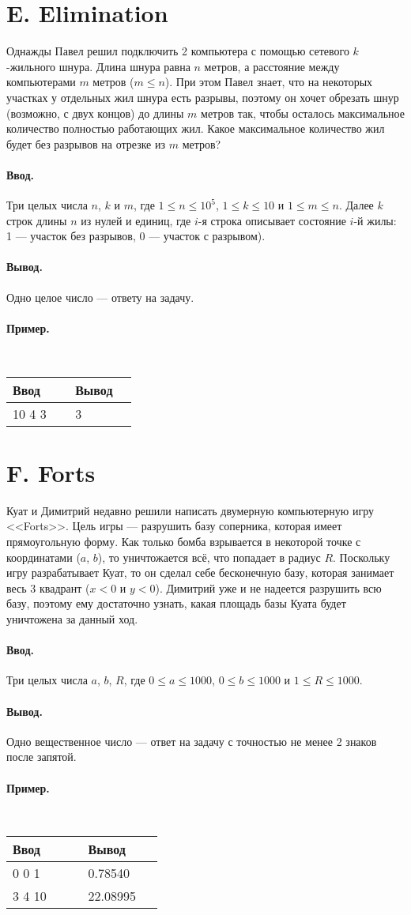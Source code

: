 \documentclass[12pt, a5paper]{article}
\newcommand{\informat}[1]
{
	\paragraph{Ввод.\\} #1
}
\newcommand{\outformat}[1]
{
	\paragraph{Вывод.\\} #1
}
\newcommand{\example}[2]
{
	\paragraph{Пример.\\}
	{\tt
	\begin{tabular}{|p{0.4\linewidth}|p{0.4\linewidth}|}
	\hline
	Ввод & Вывод \\
	\hline
	#1 & #2		\\
	\hline
	\end{tabular}
	}
}
\newcommand{\examplee}[4]
{
	\paragraph{Пример.\\}
	{\tt
	\begin{tabular}{|p{0.4\linewidth}|p{0.4\linewidth}|}
	\hline
	Ввод 	& Вывод  	\\
	\hline
	#1 		& #2 		\\
	\hline
	#3		& #4		\\
	\hline
	\end{tabular}
	}
}
\begin{document}
\section*{E. Elimination}

Однажды Павел решил подключить 2 компьютера с помощью сетевого $k$-жильного шнура. Длина шнура равна $n$ метров, а расстояние между компьютерами $m$ метров ($m \leqslant n$). При этом Павел знает, что на некоторых участках у отдельных жил шнура есть разрывы, поэтому он хочет обрезать шнур (возможно, с двух концов) до длины $m$ метров так, чтобы осталось максимальное количество полностью работающих жил. Какое максимальное количество жил будет без разрывов на отрезке из $m$ метров?

\informat{Три целых числа $n$, $k$ и $m$, где $1 \leqslant n \leqslant 10^5$,  $1 \leqslant k \leqslant 10$ и $1 \leqslant m \leqslant n$. \newline
Далее $k$ строк длины $n$ из нулей и единиц, где $i$-я строка описывает состояние $i$-й жилы: 1 --- участок без разрывов, 0 --- участок с разрывом).
}

\outformat{Одно целое число --- ответу на задачу.}

\example{
10 4 3 \newline
1110111111 \newline
1011111111 \newline
0011111100 \newline
1111110111}
{3}



\section*{F. Forts}

Куат и Димитрий недавно решили написать двумерную компьютерную игру <<Forts>>. Цель игры --- разрушить базу соперника, которая имеет прямоугольную форму. Как только бомба взрывается в некоторой точке с координатами ($a$, $b$), то уничтожается всё, что попадает в радиус $R$. Поскольку игру разрабатывает Куат, то он сделал себе бесконечную базу, которая занимает весь 3 квадрант ($x < 0$ и $y < 0$). Димитрий уже и не надеется разрушить всю базу, поэтому ему достаточно узнать, какая площадь базы Куата будет уничтожена за данный ход.

\informat{Три целых числа $a$, $b$, $R$, где $0 \le a \le 1000$, $0 \le b \le 1000$ и $1 \le R \le 1000$.}

\outformat{Одно вещественное число --- ответ на задачу с точностью не менее 2 знаков после запятой.}

\examplee{0 0 1}{0.78540}{3 4 10}{22.08995}
\end{document}
